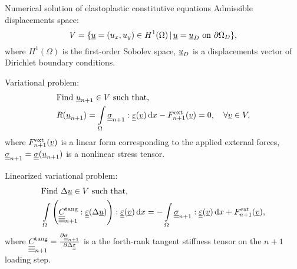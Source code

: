 \documentclass[9pt]{beamer}
\begin{document}
\begin{frame}{Numerical solution of elastoplastic constitutive equations}
  Admissible displacements space:
  \begin{equation}
      V = \{\underline{u} = (u_x, u_y) \in H^1(\Omega) \, | \, \underline{u} = \underline{u}_D \text{ on } \partial\Omega_D \},
  \end{equation}
  where $H^1(\Omega)$ is the first-order Sobolev space, $\underline{u}_D$ is a displacements vector of Dirichlet boundary conditions.
  \newline 

  Variational problem:
  \begin{align}
    & \text{Find } \underline{u}_{n+1} \in V \text{ such that,} \label{eqn:var_disc_from_1} \\ 
    & R(\underline{u}_{n+1}) = \int\limits_\Omega\underline{\underline{\sigma}}_{n+1} : \underline{\underline{\varepsilon}}(\underline{v}) \, \mathrm{d} x - F_{n+1}^\text{ext}(\underline{v}) = 0, \quad \forall \underline{v} \in V \label{eqn:var_disc_from_2},
  \end{align}
  where $F_{n+1}^\text{ext}(\underline{v})$ is a linear form corresponding to the applied external forces, $\underline{\underline{\sigma}}_{n+1} = \underline{\underline{\sigma}}(\underline{u}_{n+1})$ is a nonlinear stress tensor.
  \newline 

  Linearized variational problem:
  \begin{align}
      & \text{Find } \Delta\underline{u} \in V \text{ such that,} \label{eqn:lin_var_disc_from_1} \\ 
      & \int\limits_\Omega \left(\underline{\underline{\underline{\underline{C_{}}}}}_{n+1}^\text{tang} : \underline{\underline{\varepsilon}}(\Delta\underline{u})\right) : \underline{\underline{\varepsilon}}(\underline{v}) \, \mathrm{d} x = -\int\limits_\Omega\underline{\underline{\sigma}}_{n+1} : \underline{\underline{\varepsilon}}(\underline{v}) \, \mathrm{d} x + F^\text{ext}_{n+1}(\underline{v}) \label{eqn:lin_var_disc_from_2},
  \end{align}
  where $\underline{\underline{\underline{\underline{C_{}}}}}_{n+1}^{\text{tang}} = \frac{\partial\underline{\underline{\sigma}}_{n+1}}{\partial\Delta\underline{\underline{\varepsilon}}}$ is a the forth-rank tangent stiffness tensor on the $n+1$ loading step.
\end{frame}
\end{document}
